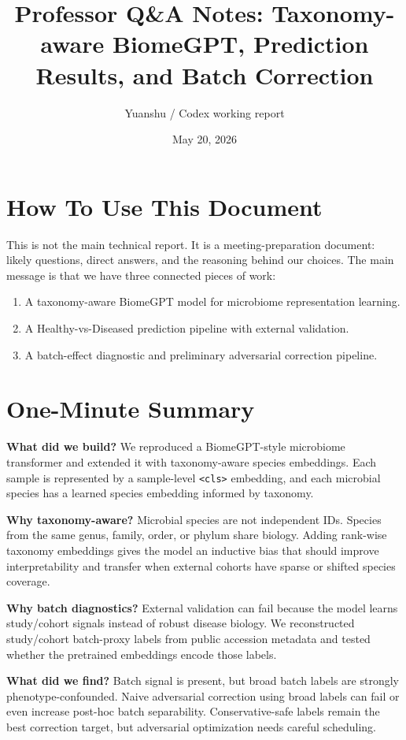 \documentclass[11pt]{article}
\title{\textbf{Professor Q\&A Notes: Taxonomy-aware BiomeGPT, Prediction Results, and Batch Correction}}
\author{Yuanshu / Codex working report}
\date{May 20, 2026}
\newcommand{\code}[1]{\texttt{\small #1}}
\begin{document}
\maketitle

\section*{How To Use This Document}

This is not the main technical report. It is a meeting-preparation document: likely
questions, direct answers, and the reasoning behind our choices. The main message is that
we have three connected pieces of work:

\begin{enumerate}
  \item A taxonomy-aware BiomeGPT model for microbiome representation learning.
  \item A Healthy-vs-Diseased prediction pipeline with external validation.
  \item A batch-effect diagnostic and preliminary adversarial correction pipeline.
\end{enumerate}

\section{One-Minute Summary}

\textbf{What did we build?} We reproduced a BiomeGPT-style microbiome transformer and
extended it with taxonomy-aware species embeddings. Each sample is represented by a
sample-level \code{<cls>} embedding, and each microbial species has a learned species
embedding informed by taxonomy.

\textbf{Why taxonomy-aware?} Microbial species are not independent IDs. Species from the
same genus, family, order, or phylum share biology. Adding rank-wise taxonomy embeddings
gives the model an inductive bias that should improve interpretability and transfer when
external cohorts have sparse or shifted species coverage.

\textbf{Why batch diagnostics?} External validation can fail because the model learns
study/cohort signals instead of robust disease biology. We reconstructed study/cohort
batch-proxy labels from public accession metadata and tested whether the pretrained
embeddings encode those labels.

\textbf{What did we find?} Batch signal is present, but broad batch labels are strongly
phenotype-confounded. Naive adversarial correction using broad labels can fail or even
increase post-hoc batch separability. Conservative-safe labels remain the best correction
target, but adversarial optimization needs careful scheduling.
\end{document}
